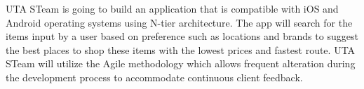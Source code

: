 UTA STeam is going to build an application that is compatible with iOS and Android operating systems using N-tier architecture. The app will search for the items input by a user based on preference such as locations and brands to suggest the best places to shop these items with the lowest prices and fastest route. UTA STeam will utilize the Agile methodology which allows frequent alteration during the development process to accommodate continuous client feedback.